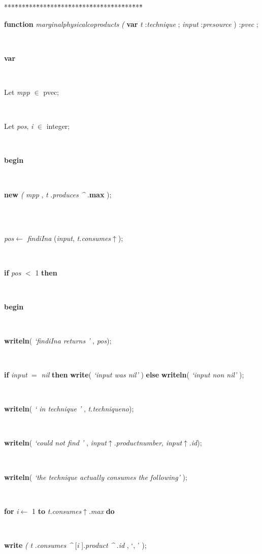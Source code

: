 \begin{tabbing}
***\=***\=***\=***\=***\=***\=***\=***\=***\=***\=***\=***\=***\=\kill
\parbox{14cm}{\textsf{\textbf{function}   \textit{marginalphysicalcoproducts} \textit{(} \textbf{var}  \textit{t} :\textit{technique} ;    \textit{input} :\textit{presource} ) :\textit{pvec} ;}}\\
\+\parbox{14cm}{\textsf{\textbf{var} }}\\
\parbox{14cm}{\textsf{Let \textit{mpp} $\in$ pvec;}}\\
\parbox{14cm}{\textsf{Let \textit{pos}, \textit{i} $\in$ integer;}}\\
\-\<\+\parbox{14cm}{\textsf{\textbf{begin} }}\\
\parbox{14cm}{\textsf{\textbf{new} \textit{(} \textit{mpp} , \textit{t} .\textit{produces} \textit{\^{}} .\textbf{max} );}}\\
\\
\parbox{14cm}{\textsf{\textit{pos}$\leftarrow$ \textit{findiIna} (\textit{input}, \textit{t.consumes}$\uparrow$\textit{})}; }\\
\+\parbox{14cm}{\textsf {\textbf {if } \textsf{\textit{pos} $<$ 1} \textbf{ then } }}\\
\<\parbox{14cm}{\textsf{\textbf{begin} }}\\
\parbox{14cm}{\textsf{\textbf{writeln}(\textit{\textrm{\textup { `findiIna returns ' } }}, \textit{pos})}; }\\
\parbox{14cm}{\textsf {\textbf {if } \textsf{\textit{input} $=$ \textit{nil}} \textbf{ then } \textsf{\textbf{write}(\textit{\textrm{\textup { `input was nil' } }})} \textbf{ else } \textsf{\textbf{writeln}(\textit{\textrm{\textup { `input non nil' } }})}; }}\\
\parbox{14cm}{\textsf{\textbf{writeln}(\textit{\textrm{\textup { ` in  technique ' } }}, \textit{t.techniqueno})}; }\\
\parbox{14cm}{\textsf{\textbf{writeln}(\textit{\textrm{\textup { `could not find ' } }}, \textit{input}$\uparrow$.\textit{productnumber}, \textit{input}$\uparrow$.\textit{id})}; }\\
\parbox{14cm}{\textsf{\textbf{writeln}(\textit{\textrm{\textup { `the technique actually consumes the following' } }})}; }\\
\+\parbox{14cm}{\textsf {\textbf {for } \textsf{\textit{i}$\leftarrow$ 1} \textbf{ to } \textsf{\textit{t.consumes}$\uparrow$.\textit{max}} \textbf{ do } }}\\
\-\parbox{14cm}{\textsf{\textbf{write} \textit{(} \textit{t} .\textit{consumes} \textit{\^{}} [\textit{i} ].\textit{product} \textit{\^{}} .\textit{id} ,\textrm{\textup { `, ' } });}}\\

\end{tabbing}
